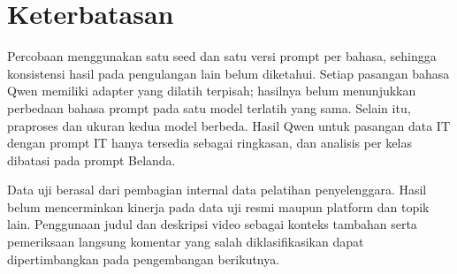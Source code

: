 \documentclass[11pt]{article}
\begin{document}
\section*{Keterbatasan}
Percobaan menggunakan satu seed dan satu versi prompt per bahasa, sehingga konsistensi hasil pada pengulangan lain belum diketahui. Setiap pasangan bahasa Qwen memiliki adapter yang dilatih terpisah; hasilnya belum menunjukkan perbedaan bahasa prompt pada satu model terlatih yang sama. Selain itu, praproses dan ukuran kedua model berbeda. Hasil Qwen untuk pasangan data IT dengan prompt IT hanya tersedia sebagai ringkasan, dan analisis per kelas dibatasi pada prompt Belanda.

Data uji berasal dari pembagian internal data pelatihan penyelenggara. Hasil belum mencerminkan kinerja pada data uji resmi maupun platform dan topik lain. Penggunaan judul dan deskripsi video sebagai konteks tambahan serta pemeriksaan langsung komentar yang salah diklasifikasikan dapat dipertimbangkan pada pengembangan berikutnya.


\end{document}

